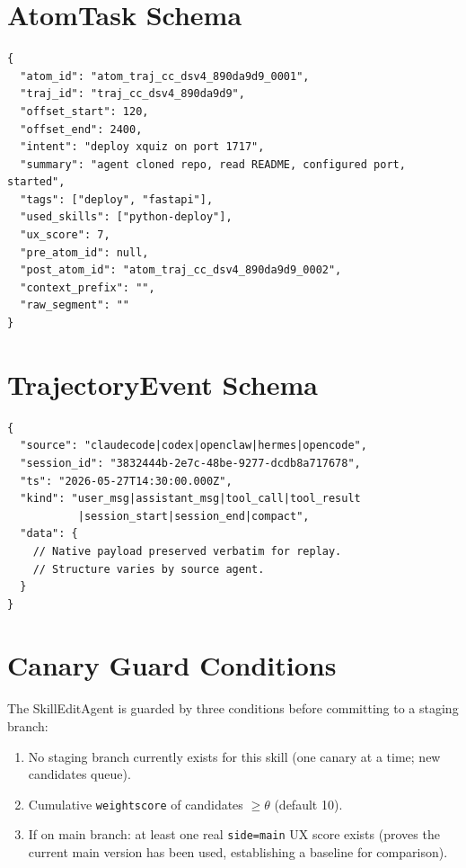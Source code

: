 \documentclass[11pt]{article}
\begin{document}
\section{AtomTask Schema}
\label{app:atomtask}

\begin{verbatim}
{
  "atom_id": "atom_traj_cc_dsv4_890da9d9_0001",
  "traj_id": "traj_cc_dsv4_890da9d9",
  "offset_start": 120,
  "offset_end": 2400,
  "intent": "deploy xquiz on port 1717",
  "summary": "agent cloned repo, read README, configured port, started",
  "tags": ["deploy", "fastapi"],
  "used_skills": ["python-deploy"],
  "ux_score": 7,
  "pre_atom_id": null,
  "post_atom_id": "atom_traj_cc_dsv4_890da9d9_0002",
  "context_prefix": "",
  "raw_segment": ""
}
\end{verbatim}

\section{TrajectoryEvent Schema}
\label{app:trajevent}

\begin{verbatim}
{
  "source": "claudecode|codex|openclaw|hermes|opencode",
  "session_id": "3832444b-2e7c-48be-9277-dcdb8a717678",
  "ts": "2026-05-27T14:30:00.000Z",
  "kind": "user_msg|assistant_msg|tool_call|tool_result
           |session_start|session_end|compact",
  "data": {
    // Native payload preserved verbatim for replay.
    // Structure varies by source agent.
  }
}
\end{verbatim}

\section{Canary Guard Conditions}
\label{app:canary-guards}

The SkillEditAgent is guarded by three conditions before committing to a staging branch:
\begin{enumerate}
    \item No staging branch currently exists for this skill (one canary at a time; new candidates queue).
    \item Cumulative \texttt{weightscore} of candidates $\geq \theta$ (default 10).
    \item If on main branch: at least one real \texttt{side=main} UX score exists (proves the current main version has been used, establishing a baseline for comparison).
\end{enumerate}
\end{document}
